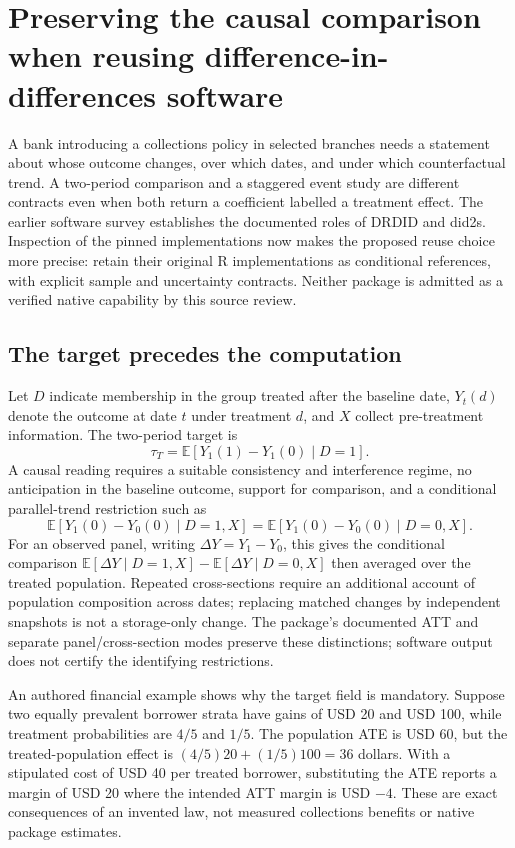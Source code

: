 \section{Preserving the causal comparison when reusing difference-in-differences software}
\label{sec:exec24-panel-reuse}
A bank introducing a collections policy in selected branches needs a statement
about whose outcome changes, over which dates, and under which counterfactual
trend. A two-period comparison and a staggered event study are different
contracts even when both return a coefficient labelled a treatment effect.
The earlier software survey establishes the documented roles of DRDID and
did2s. Inspection of the pinned implementations now makes the proposed reuse
choice more precise: retain their original R implementations as conditional
references, with explicit sample and uncertainty contracts. Neither package is
admitted as a verified native capability by this source review.
\citep{v12_sw_drdid,v12_sw_did2s,exec24_drdid_reuse_source,exec24_did2s_reuse_source}

\subsection{The target precedes the computation}
Let $D$ indicate membership in the group treated after the baseline date,
$Y_t(d)$ denote the outcome at date $t$ under treatment $d$, and $X$ collect
pre-treatment information. The two-period target is
\[
 \tau_T=\mathbb E[Y_1(1)-Y_1(0)\mid D=1].
\]
A causal reading requires a suitable consistency and interference regime,
no anticipation in the baseline outcome, support for comparison, and a
conditional parallel-trend restriction such as
\[
 \mathbb E[Y_1(0)-Y_0(0)\mid D=1,X]
 =\mathbb E[Y_1(0)-Y_0(0)\mid D=0,X].
\]
For an observed panel, writing $\Delta Y=Y_1-Y_0$, this gives the conditional
comparison $\mathbb E[\Delta Y\mid D=1,X]-\mathbb E[\Delta Y\mid D=0,X]$
then averaged over the treated population. Repeated cross-sections require
an additional account of population composition across dates; replacing
matched changes by independent snapshots is not a storage-only change.
The package's documented ATT and separate panel/cross-section modes preserve
these distinctions; software output does not certify the identifying
restrictions.~\citep{v12_sw_drdid,exec24_drdid_reuse_source}

An authored financial example shows why the target field is mandatory.
Suppose two equally prevalent borrower strata have gains of USD 20 and USD 100,
while treatment probabilities are $4/5$ and $1/5$. The population ATE is
USD 60, but the treated-population effect is
$(4/5)20+(1/5)100=36$ dollars. With a stipulated cost of USD 40 per treated
borrower, substituting the ATE reports a margin of USD 20 where the intended
ATT margin is USD $-4$. These are exact consequences of an invented law,
not measured collections benefits or native package estimates.
\citep{exec24_panel_reuse_reference}

